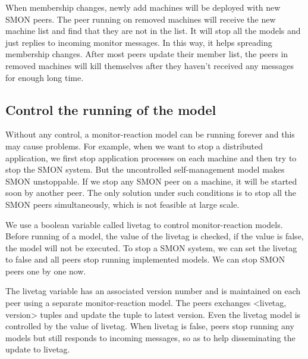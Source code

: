 When membership changes, newly add machines will be deployed
with new SMON peers. The peer running on removed machines
will receive the new machine list and find that they are not
in the list. It will stop all the models  and
just replies to incoming monitor messages. In this way, it
helps spreading membership changes. After most peers update
their member list, the peers in removed machines will kill
themselves after they haven't received any messages for
enough long time.


\subsection{Control the running of the model}
\label{subsec:livetag}

Without any control, a monitor-reaction model can be running
forever and this may cause problems. For example, when we
want to stop a distributed application, we first stop
application processes on each machine and then try to stop
the SMON system. But the uncontrolled self-management model
makes SMON unstoppable. If we stop any SMON peer on a
machine, it will be started soon by another peer. The only
solution under such conditions is to stop all the SMON peers
simultaneously, which is not feasible at large scale.

We use a boolean variable called livetag to control
monitor-reaction models. Before running of a model, the
value of the livetag is checked, if the value is false, the
model will not be executed. To stop a SMON system, we can
set the livetag to false and all peers stop running
implemented models. We can stop SMON peers one by one now.

The livetag variable has an associated version number and is
maintained on each peer using a separate monitor-reaction
model. The peers exchanges <livetag, version> tuples and
update the tuple to latest version. Even the livetag model
is controlled by the value of livetag. When livetag is
false, peers stop running any models but still responds to
incoming messages, so as to help disseminating the update to
livetag.


